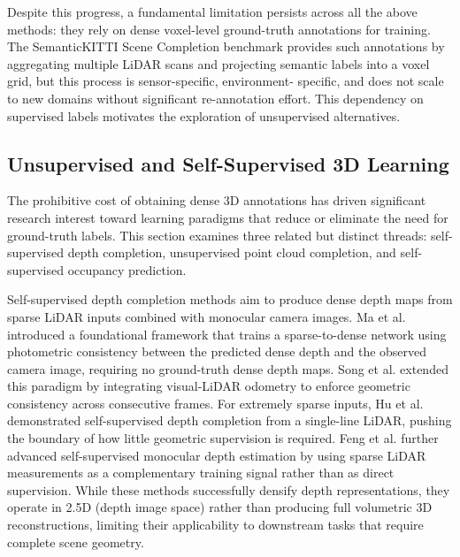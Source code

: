 \documentclass[a4paper, 12pt]{article}
\begin{document}
	Despite this progress, a fundamental limitation persists across all the above
	methods: they rely on dense voxel-level ground-truth annotations for training.
	The SemanticKITTI Scene Completion benchmark \cite{Behley_2019_ICCV} provides
	such annotations by aggregating multiple LiDAR scans and projecting semantic
	labels into a voxel grid, but this process is sensor-specific, environment-
	specific, and does not scale to new domains without significant re-annotation
	effort. This dependency on supervised labels motivates the exploration of
	unsupervised alternatives.
	
	\subsection{Unsupervised and Self-Supervised 3D Learning}
	
	The prohibitive cost of obtaining dense 3D annotations has driven significant
	research interest toward learning paradigms that reduce or eliminate the need
	for ground-truth labels. This section examines three related but distinct
	threads: self-supervised depth completion, unsupervised point cloud completion,
	and self-supervised occupancy prediction.
	
	Self-supervised depth completion methods aim to produce dense depth maps from
	sparse LiDAR inputs combined with monocular camera images. Ma et al.
	\cite{8793637} introduced a foundational framework that trains a sparse-to-dense
	network using photometric consistency between the predicted dense depth and
	the observed camera image, requiring no ground-truth dense depth maps. Song et
	al. \cite{9525167} extended this paradigm by integrating visual-LiDAR odometry
	to enforce geometric consistency across consecutive frames. For extremely sparse
	inputs, Hu et al. \cite{10258421} demonstrated self-supervised depth completion
	from a single-line LiDAR, pushing the boundary of how little geometric
	supervision is required. Feng et al. \cite{pmlr-v164-feng22a} further advanced
	self-supervised monocular depth estimation by using sparse LiDAR measurements
	as a complementary training signal rather than as direct supervision. While
	these methods successfully densify depth representations, they operate in 2.5D
	(depth image space) rather than producing full volumetric 3D reconstructions,
	limiting their applicability to downstream tasks that require complete scene
	geometry.
	
\end{document}
